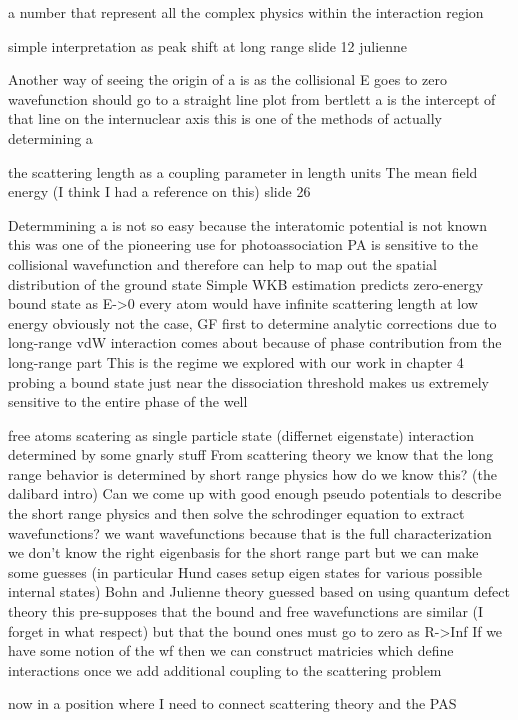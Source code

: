 	a number that represent all the complex physics within the interaction region
	
	simple interpretation as peak shift at long range
		slide 12 julienne
	
Another way of seeing the origin of a is as the collisional E goes to zero
	wavefunction should go to a straight line
		plot from bertlett
	a is the intercept of that line on the internuclear axis
		this is one of the methods of actually determining a

the scattering length as a coupling parameter in length units
	The mean field energy (I think I had a reference on this)
	slide 26

Determmining a is not so easy because the interatomic potential is not known
	this was one of the pioneering use for photoassociation
	PA is sensitive to the collisional wavefunction and therefore can help to map out the spatial distribution of the ground state
Simple WKB estimation predicts zero-energy bound state as E->0
	every atom would have infinite scattering length at low energy
	obviously not the case, GF first to determine analytic corrections due to long-range vdW interaction
		comes about because of phase contribution from the long-range part
This is the regime we explored with our work in chapter 4
	probing a bound state just near the dissociation threshold makes us extremely sensitive to the entire phase of the well


free atoms
scatering as single particle state (differnet eigenstate)
	interaction determined by some gnarly stuff
From scattering theory we know that the long range behavior is determined by short range physics
	how do we know this? (the dalibard intro)
Can we come up with good enough pseudo potentials to describe the short range physics and then solve the schrodinger equation to extract wavefunctions?
	we want wavefunctions because that is the full characterization
	we don't know the right eigenbasis for the short range part but we can make some guesses (in particular Hund cases setup eigen states for various possible internal states)
	Bohn and Julienne theory guessed based on using quantum defect theory
		this pre-supposes that the bound and free wavefunctions are similar (I forget in what respect) but that the bound ones must go to zero as R->Inf
If we have some notion of the wf then we can construct matricies which define interactions once we add additional coupling to the scattering problem


now in a position where I need to connect scattering theory and the PAS


